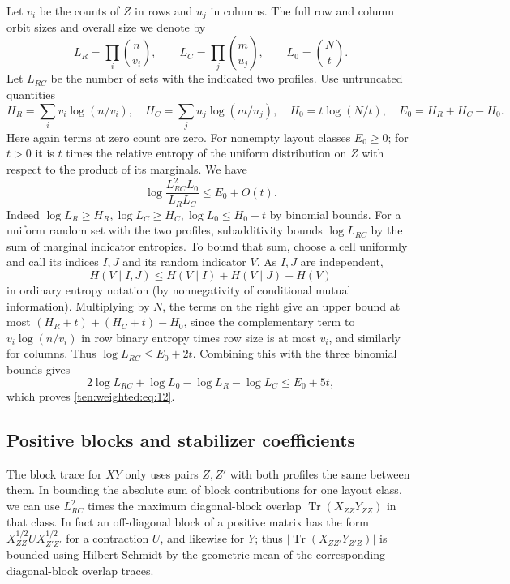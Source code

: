 Let \(v_i\) be the counts of \(Z\) in rows and \(u_j\) in columns. The full row and column orbit sizes and overall size we denote by
\[
 L_R=\prod_i\binom n{v_i},\qquad L_C=\prod_j\binom m{u_j},\qquad L_0=\binom Nt.
\]
Let \(L_{RC}\) be the number of sets with the indicated two profiles. Use untruncated quantities
\[
 H_R=\sum_i v_i\log(n/v_i),\quad H_C=\sum_j u_j\log(m/u_j),\quad H_0=t\log(N/t),
 \quad E_0=H_R+H_C-H_0.
\]
Here again terms at zero count are zero. For nonempty layout classes \(E_0\ge 0\); for \(t>0\) it is \(t\) times the relative entropy of the uniform distribution on \(Z\) with respect to the product of its marginals. We have
\begin{equation}
 \log \frac{L_{RC}^2 L_0}{L_R L_C}\le E_0+O(t).                                            \label{ten:weighted:eq:12}
\end{equation}
Indeed \(\log L_R\ge H_R,\log L_C\ge H_C,\log L_0\le H_0+t\) by binomial bounds. For a uniform random set with the two profiles, subadditivity bounds \(\log L_{RC}\) by the sum of marginal indicator entropies. To bound that sum, choose a cell uniformly and call its indices \(I,J\) and its random indicator \(V\). As \(I,J\) are independent,
\[
 H(V\mid I,J)\le H(V\mid I)+H(V\mid J)-H(V)
\]
in ordinary entropy notation (by nonnegativity of conditional mutual information). Multiplying by \(N\), the terms on the right give an upper bound at most \((H_R+t)+(H_C+t)-H_0\), since the complementary term to \(v_i\log(n/v_i)\) in row binary entropy times row size is at most \(v_i\), and similarly for columns. Thus $\log L_{RC}\le E_0+2t$. Combining this with the three binomial bounds gives
\[
 2\log L_{RC}+\log L_0-\log L_R-\log L_C\le E_0+5t,
\]
which proves \eqref{ten:weighted:eq:12}.


\subsection{Positive blocks and stabilizer coefficients}
\label{ten:weighted:part:194}
The block trace for \(X Y\) only uses pairs \(Z,Z'\) with both profiles the same between them. In bounding the absolute sum of block contributions for one layout class, we can use \(L_{RC}^2\) times the maximum diagonal-block overlap \(\operatorname{Tr}(X_{ZZ}Y_{ZZ})\) in that class. In fact an off-diagonal block of a positive matrix has the form \(X_{ZZ}^{1/2} U X_{Z'Z'}^{1/2}\) for a contraction \(U\), and likewise for \(Y\); thus \(|\operatorname{Tr}(X_{ZZ'}Y_{Z'Z})|\) is bounded using Hilbert-Schmidt by the geometric mean of the corresponding diagonal-block overlap traces.

